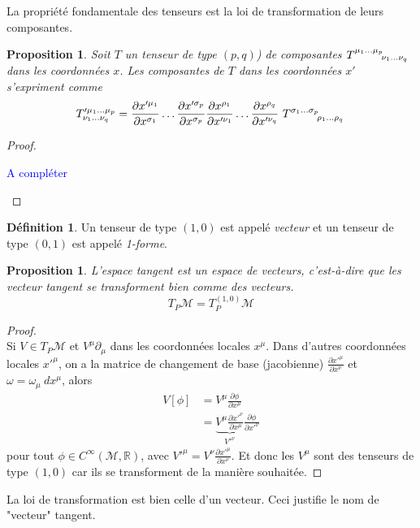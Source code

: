 \documentclass[a4paper,11pt]{report}
\theoremstyle{definition}
\theoremstyle{plain}
\newtheorem{prop}[thm]{Proposition}
\theoremstyle{definition}
\newtheorem{defn}{Définition}[chapter]
\theoremstyle{remark}
\newcommand{\comp}{\begin{center}\textcolor{blue}{A compléter}\end{center}}
\newcommand{\M}{\mathscr{M}}
\newcommand{\p}{\partial}
\begin{document}
                La propriété fondamentale des tenseurs est la loi de transformation de leurs composantes.
                
                \begin{prop}
                    Soit $T$ un tenseur de type $(p,q)$) de composantes $T\indices{^{\mu_1\dots\mu_p}_{\nu_1\dots\nu_q}}$ dans les coordonnées $x$. Les composantes de $T$ dans les coordonnées $x'$ s'expriment comme 
                    \begin{equation}
                        T'^{\mu_1\dots\mu_p}_{\nu_1\dots\nu_q} = \pdv{x'^{\mu_1}}{x^{\sigma_1}} (P)\dots\pdv{x'^{\sigma_p}}{x^{\sigma_p}}(P)\pdv{x^{\rho_1}}{x'^{\nu_1}}(P)\dots\pdv{x^{\rho_q}}{x'^{\nu_q}}(P)~T\indices{^{\sigma_1\dots\sigma_p}_{\rho_1\dots\rho_q}}
                    \end{equation}
                \end{prop}
                
                \begin{proof}${}$\\
                    \comp
                \end{proof}
                
                \begin{defn}
                    Un tenseur de type $(1,0)$ est appelé \textit{vecteur} et un tenseur de type $(0,1)$ est appelé \textit{1-forme}.
                \end{defn}
                
                \begin{prop}
                    L'espace tangent est un espace de vecteurs, c'est-à-dire que les vecteur tangent se transforment bien comme des vecteurs.
                    \begin{equation}
                        T_P\M = T^{(1,0)}_P\M
                    \end{equation}
                \end{prop}
                
                \begin{proof}${}$\\
                    Si $V\in T_P\M$ et $V^\mu\p_\mu$ dans les coordonnées locales $x^\mu$. Dans d'autres coordonnées locales $x'^\mu$, on a la matrice de changement de base (jacobienne) $ \frac{\p x'^\mu}{\p x^\nu}$ et $\omega = \omega_\mu~dx^\mu$, alors
                    \begin{align}
                        V[\phi] &= V^\mu \frac{\p\phi}{\p x^\mu} \\
                        &=  \underbrace{V^\mu\frac{\p x'^\nu}{\p x^\mu}}_{V'^\nu}\frac{\p\phi}{\p x'^\nu}
                    \end{align}
                    pour tout $\phi\in C^\infty(\M,\mathbb{R})$, avec $V'^\mu = V^\nu\frac{\p x'^\mu}{\p x^\nu}$. Et donc les $V^\mu$ sont des tenseurs de type $(1,0)$ car ils se transforment de la manière souhaitée.
                \end{proof}
                La loi de transformation est bien celle d'un vecteur. Ceci justifie le nom de "vecteur" tangent.\\
                
\end{document}
